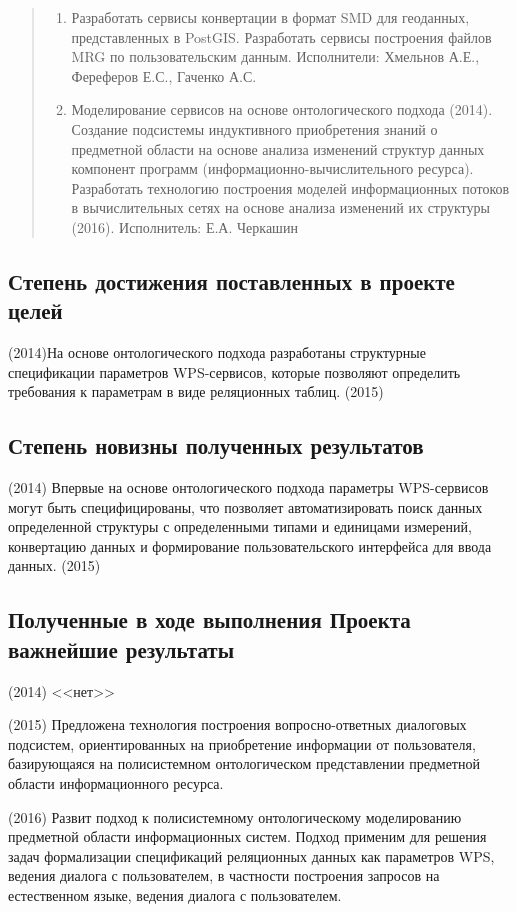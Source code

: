 \documentclass[12pt,a4paper]{ltxdoc}
\begin{document}
\begin{quote}
\begin{enumerate}
\item Разработать сервисы конвертации в формат SMD для геоданных, представленных в PostGIS. Разработать сервисы построения файлов MRG по пользовательским данным. Исполнители: Хмельнов А.Е., Фереферов Е.С., Гаченко А.С.

\item Моделирование сервисов на основе онтологического подхода (2014). Создание подсистемы индуктивного приобретения знаний о предметной области на основе анализа изменений структур данных компонент программ (информационно-вычислительного ресурса). Разработать технологию построения моделей информационных потоков в вычислительных сетях на основе анализа изменений их структуры (2016). Исполнитель: Е.А. Черкашин
\end{enumerate}
\end{quote}

\subsection{Степень достижения поставленных в проекте целей}
 (2014)На основе онтологического подхода разработаны структурные спецификации
 параметров WPS-сервисов, которые позволяют определить требования к параметрам в
 виде реляционных таблиц.
 (2015)

 \subsection{Степень новизны полученных результатов}
 (2014) Впервые на основе онтологического подхода параметры WPS-сервисов могут быть специфицированы, что позволяет автоматизировать поиск данных определенной структуры с определенными типами и единицами измерений, конвертацию данных и формирование пользовательского интерфейса для ввода данных. (2015)



\subsection{Полученные в ходе выполнения Проекта важнейшие результаты}
(2014) <<нет>>

(2015) Предложена технология построения вопросно-ответных диалоговых подсистем, ориентированных на приобретение информации от пользователя, базирующаяся на полисистемном онтологическом представлении предметной области информационного ресурса.

(2016) Развит подход к полисистемному онтологическому моделированию предметной области информационных систем.  Подход применим для решения задач формализации спецификаций реляционных данных как параметров WPS, ведения диалога с пользователем, в частности построения запросов на естественном языке, ведения диалога с пользователем.
\end{document}
